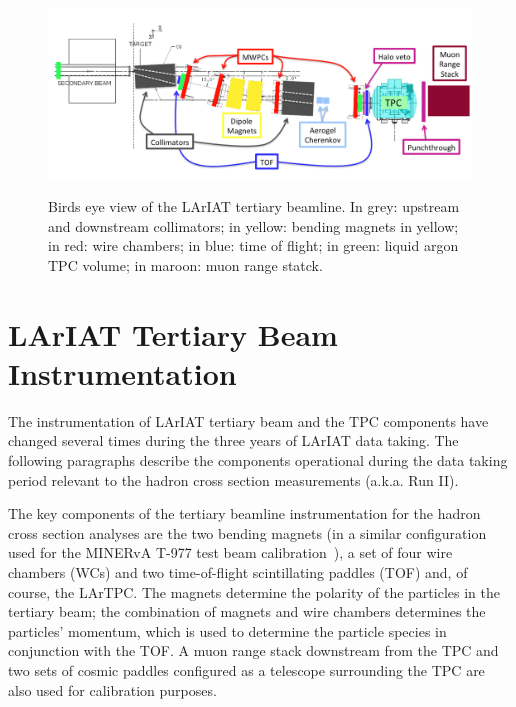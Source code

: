 \begin{figure}
  \centering  	
\includegraphics[width=\textwidth,height=\textheight,keepaspectratio]{Chapter-3/Images/Tertiary.png}
\label{fig:tert-layout}
\caption{Birds eye view of the LArIAT tertiary beamline. In grey: upstream and downstream collimators; in yellow: bending magnets in yellow; in red: wire chambers; in blue: time of flight; in green: liquid argon TPC volume; in maroon: muon range statck.}
\end{figure}


\section{LArIAT Tertiary Beam Instrumentation}\label{sec:Instrumentation}

The instrumentation of  LArIAT tertiary beam and the TPC components have changed several times during the three years of LArIAT data taking. The following paragraphs describe the components operational during the data taking period relevant to the hadron cross section measurements (a.k.a. Run II).

The key components of the tertiary beamline instrumentation for the hadron cross section analyses are the two bending magnets (in a similar configuration used for the  MINERvA T-977 test beam calibration~\cite{MinervaTestbeam}), a set of four wire chambers (WCs) and two time-of-flight scintillating paddles (TOF) and, of course, the LArTPC.  The magnets determine the polarity of the particles in the tertiary beam; the combination of magnets and wire chambers determines the particles' momentum, which is used to determine the particle species in conjunction with the TOF.
A muon range stack downstream from the TPC and two sets of cosmic paddles configured as a telescope surrounding the TPC are also used for calibration purposes.


